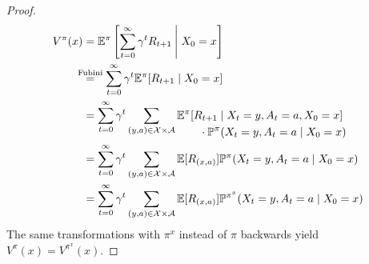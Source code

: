 \begin{proof}
	\begin{align*}
		V^\pi(x)
		&=\E^\pi\left[\sum_{t=0}^\infty \gamma^t R_{t+1} \:\middle|\; X_0=x \right]\\
		&\lxeq{\text{Fubini}} \sum_{t=0}^\infty \gamma^t \E^\pi[R_{t+1}\mid X_0=x]\\
		&=\sum_{t=0}^\infty \gamma^t \sum_{(y,a)\in\cX\times\cA}
		\begin{aligned}[t]
			&\E^\pi[R_{t+1}\mid X_t=y, A_t=a, X_0=x]\\
			&\qquad\cdot\Pr^\pi(X_t=y,A_t=a\mid X_0=x)
		\end{aligned}\\
		&=\sum_{t=0}^\infty \gamma^t \sum_{(y,a)\in\cX\times\cA}\E[R_{(x,a)}]
		\Pr^{\pi}(X_t=y,A_t=a\mid X_0=x)\\
		&=\sum_{t=0}^\infty \gamma^t \sum_{(y,a)\in\cX\times\cA}\E[R_{(x,a)}]
		\Pr^{\pi^x}(X_t=y,A_t=a\mid X_0=x)
	\end{align*}
	The same transformations with \(\pi^x\) instead of \(\pi\) backwards yield \(V^\pi(x)=V^{\pi^x}(x)\).
\end{proof}


